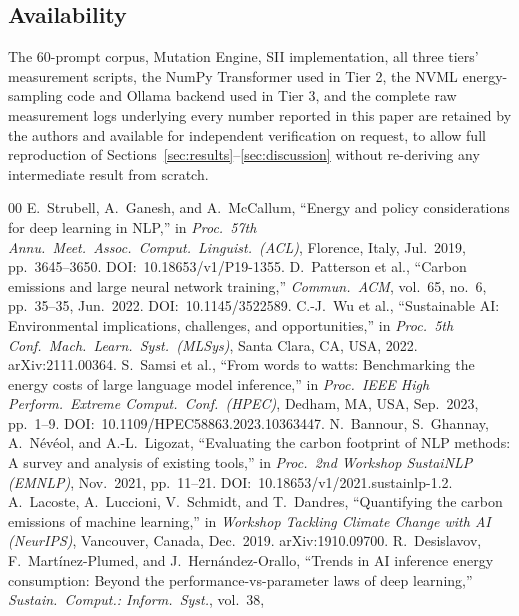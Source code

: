 \documentclass[conference]{IEEEtran}
\begin{document}
\subsection*{Availability}
The 60-prompt corpus, Mutation Engine, SII implementation, all three
tiers' measurement scripts, the NumPy Transformer used in Tier 2, the
NVML energy-sampling code and Ollama backend used in Tier 3, and the
complete raw measurement logs underlying every number reported in this
paper are retained by the authors and available for independent
verification on request, to allow full reproduction of
Sections~\ref{sec:results}--\ref{sec:discussion} without re-deriving
any intermediate result from scratch.
\balance
\begin{thebibliography}{00}
E.~Strubell, A.~Ganesh, and A.~McCallum,
``Energy and policy considerations for deep learning in NLP,''
in \textit{Proc.\ 57th Annu.\ Meet.\ Assoc.\ Comput.\ Linguist.\ (ACL)},
Florence, Italy, Jul.~2019, pp.~3645--3650.
DOI:~10.18653/v1/P19-1355.
D.~Patterson et al.,
``Carbon emissions and large neural network training,''
\textit{Commun.\ ACM}, vol.~65, no.~6, pp.~35--35, Jun.~2022.
DOI:~10.1145/3522589.
C.-J.~Wu et al.,
``Sustainable AI: Environmental implications, challenges,
and opportunities,''
in \textit{Proc.\ 5th Conf.\ Mach.\ Learn.\ Syst.\ (MLSys)},
Santa Clara, CA, USA, 2022.
arXiv:2111.00364.
S.~Samsi et al.,
``From words to watts: Benchmarking the energy costs of large
language model inference,''
in \textit{Proc.\ IEEE High Perform.\ Extreme Comput.\ Conf.\
(HPEC)}, Dedham, MA, USA, Sep.~2023, pp.~1--9.
DOI:~10.1109/HPEC58863.2023.10363447.
N.~Bannour, S.~Ghannay, A.~N\'ev\'eol, and A.-L.~Ligozat,
``Evaluating the carbon footprint of NLP methods: A survey
and analysis of existing tools,''
in \textit{Proc.\ 2nd Workshop SustaiNLP (EMNLP)},
Nov.~2021, pp.~11--21.
DOI:~10.18653/v1/2021.sustainlp-1.2.
A.~Lacoste, A.~Luccioni, V.~Schmidt, and T.~Dandres,
``Quantifying the carbon emissions of machine learning,''
in \textit{Workshop Tackling Climate Change with AI (NeurIPS)},
Vancouver, Canada, Dec.~2019.
arXiv:1910.09700.
R.~Desislavov, F.~Mart\'inez-Plumed, and J.~Hern\'andez-Orallo,
``Trends in AI inference energy consumption: Beyond the
performance-vs-parameter laws of deep learning,''
\textit{Sustain.\ Comput.: Inform.\ Syst.}, vol.~38,

\end{thebibliography}
\end{document}
